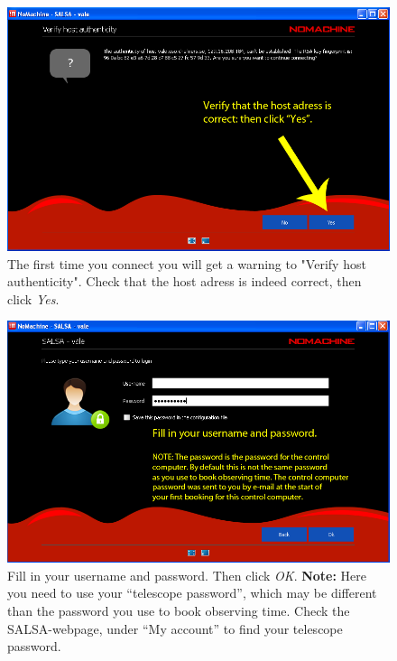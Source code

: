 \begin{figure}[H]
    \centering
    \includegraphics[height=0.25\paperheight]{../figures/nomachinefigs/fig5_verify.png}
    \caption{The first time you connect you will get a warning to "Verify host authenticity". Check that the host adress is indeed correct, then click \emph{Yes}.}
    \label{fig:verify}
\end{figure}

\begin{figure}[H]
    \centering
    \includegraphics[height=0.25\paperheight]{../figures/nomachinefigs/fig6_userpass.png}
    \caption{Fill in your username and password. Then click \emph{OK}. 
{\bf Note:} Here you need to use your ``telescope password'', which may be different
than the password you use to book observing time. Check the SALSA-webpage, under ``My account'' to find your telescope password.}
    \label{fig:userpass}
\end{figure}

